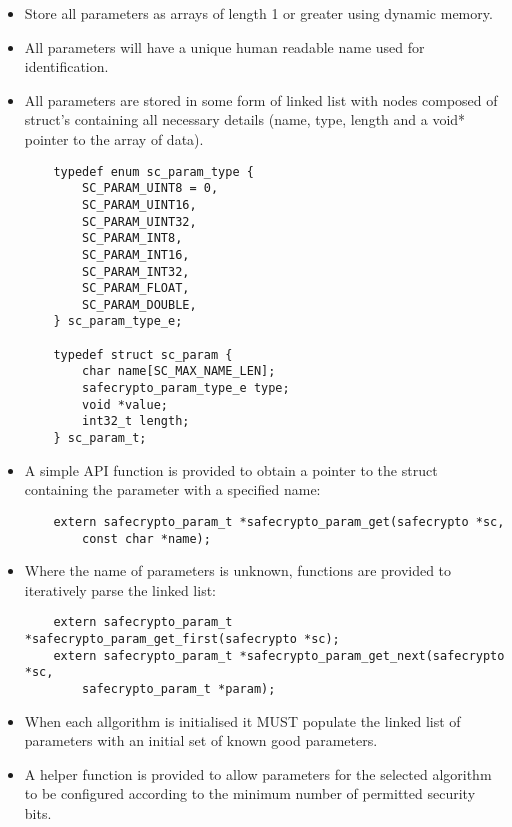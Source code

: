 \begin{itemize}
\item Store all parameters as arrays of length 1 or greater using dynamic memory.
\item All parameters will have a unique human readable name used for identification.
\item All parameters are stored in some form of linked list with nodes composed of struct’s containing all necessary details (name, type, length and a void* pointer to the array of data).

\begin{verbatim}
    typedef enum sc_param_type {
        SC_PARAM_UINT8 = 0,
        SC_PARAM_UINT16,
        SC_PARAM_UINT32,
        SC_PARAM_INT8,
        SC_PARAM_INT16,
        SC_PARAM_INT32,
        SC_PARAM_FLOAT,
        SC_PARAM_DOUBLE,
    } sc_param_type_e;

    typedef struct sc_param {
        char name[SC_MAX_NAME_LEN];
        safecrypto_param_type_e type;
        void *value;
        int32_t length;
    } sc_param_t;
\end{verbatim}


\item A simple API function is provided to obtain a pointer to the struct containing the parameter with a specified name:

\begin{verbatim}
    extern safecrypto_param_t *safecrypto_param_get(safecrypto *sc,
        const char *name);
\end{verbatim}

\item Where the name of parameters is unknown, functions are provided to iteratively parse the linked list:

\begin{verbatim}
    extern safecrypto_param_t *safecrypto_param_get_first(safecrypto *sc);
    extern safecrypto_param_t *safecrypto_param_get_next(safecrypto *sc,
        safecrypto_param_t *param);
\end{verbatim}

\item When each allgorithm is initialised it MUST populate the linked list of parameters with an initial set of known good parameters.
\item A helper function is provided to allow parameters for the selected algorithm to be configured according to the minimum number of permitted security bits.
\end{itemize}

